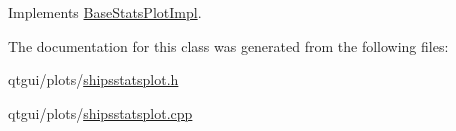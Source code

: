 Implements \mbox{\hyperlink{class_base_stats_plot_impl_aa483fe8053767302195bb82bf9a3d7fb}{Base\+Stats\+Plot\+Impl}}.



The documentation for this class was generated from the following files\+:\begin{DoxyCompactItemize}
\item 
qtgui/plots/\mbox{\hyperlink{shipsstatsplot_8h}{shipsstatsplot.\+h}}\item 
qtgui/plots/\mbox{\hyperlink{shipsstatsplot_8cpp}{shipsstatsplot.\+cpp}}\end{DoxyCompactItemize}
